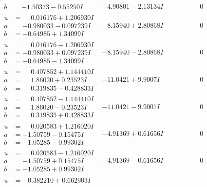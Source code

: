 \documentclass[1p]{elsarticle_modified}
\theoremstyle{definition}
\begin{document}
$$\begin{array}{c|c|c}
\begin{aligned}
b &= -1.50373 - 0.55250 I\end{aligned}
 & -4.90801 - 2.13134 I & \phantom{-0.000000 } 0 \\ \hline\begin{aligned}
u &= \phantom{-}0.016176 + 1.206930 I \\
a &= -0.980033 - 0.097239 I \\
b &= -0.64985 + 1.34099 I\end{aligned}
 & -8.15940 + 2.80868 I & \phantom{-0.000000 } 0 \\ \hline\begin{aligned}
u &= \phantom{-}0.016176 - 1.206930 I \\
a &= -0.980033 + 0.097239 I \\
b &= -0.64985 - 1.34099 I\end{aligned}
 & -8.15940 - 2.80868 I & \phantom{-0.000000 } 0 \\ \hline\begin{aligned}
u &= \phantom{-}0.407852 + 1.144410 I \\
a &= \phantom{-}1.86020 + 0.23523 I \\
b &= \phantom{-}0.319835 - 0.428833 I\end{aligned}
 & -11.0421 + 9.9007 I & \phantom{-0.000000 } 0 \\ \hline\begin{aligned}
u &= \phantom{-}0.407852 - 1.144410 I \\
a &= \phantom{-}1.86020 - 0.23523 I \\
b &= \phantom{-}0.319835 + 0.428833 I\end{aligned}
 & -11.0421 - 9.9007 I & \phantom{-0.000000 } 0 \\ \hline\begin{aligned}
u &= \phantom{-}0.020583 + 1.216020 I \\
a &= -1.50759 - 0.15475 I \\
b &= -1.05285 - 0.99302 I\end{aligned}
 & -4.91369 + 0.61656 I & \phantom{-0.000000 } 0 \\ \hline\begin{aligned}
u &= \phantom{-}0.020583 - 1.216020 I \\
a &= -1.50759 + 0.15475 I \\
b &= -1.05285 + 0.99302 I\end{aligned}
 & -4.91369 - 0.61656 I & \phantom{-0.000000 } 0 \\ \hline\begin{aligned}
u &= -0.382210 + 0.662903 I \\

\end{aligned}
\end{array}$$
\end{document}
